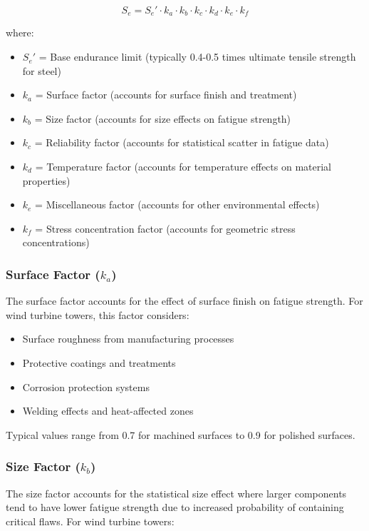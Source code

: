 \documentclass[12pt]{article}
\begin{document}
\begin{equation}
S_e = S_e' \cdot k_a \cdot k_b \cdot k_c \cdot k_d \cdot k_e \cdot k_f
\end{equation}

where:
\begin{itemize}
    \item $S_e'$ = Base endurance limit (typically 0.4-0.5 times ultimate tensile strength for steel)
    \item $k_a$ = Surface factor (accounts for surface finish and treatment)
    \item $k_b$ = Size factor (accounts for size effects on fatigue strength)
    \item $k_c$ = Reliability factor (accounts for statistical scatter in fatigue data)
    \item $k_d$ = Temperature factor (accounts for temperature effects on material properties)
    \item $k_e$ = Miscellaneous factor (accounts for other environmental effects)
    \item $k_f$ = Stress concentration factor (accounts for geometric stress concentrations)
\end{itemize}

\subsubsection{Surface Factor ($k_a$)}

The surface factor accounts for the effect of surface finish on fatigue strength. For wind turbine towers, this factor considers:
\begin{itemize}
    \item Surface roughness from manufacturing processes
    \item Protective coatings and treatments
    \item Corrosion protection systems
    \item Welding effects and heat-affected zones
\end{itemize}

Typical values range from 0.7 for machined surfaces to 0.9 for polished surfaces.

\subsubsection{Size Factor ($k_b$)}

The size factor accounts for the statistical size effect where larger components tend to have lower fatigue strength due to increased probability of containing critical flaws. For wind turbine towers:
\end{document}
